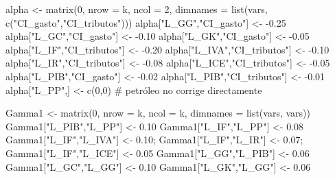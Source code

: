 \documentclass[
  spanish,
  letterpaper,
  DIV=11,
  numbers=noendperiod]{scrartcl}
\newenvironment{Shaded}{\begin{snugshade}}{\end{snugshade}}
\newcommand{\AttributeTok}[1]{\textcolor[rgb]{0.40,0.45,0.13}{#1}}
\newcommand{\CommentTok}[1]{\textcolor[rgb]{0.37,0.37,0.37}{#1}}
\newcommand{\DecValTok}[1]{\textcolor[rgb]{0.68,0.00,0.00}{#1}}
\newcommand{\FloatTok}[1]{\textcolor[rgb]{0.68,0.00,0.00}{#1}}
\newcommand{\FunctionTok}[1]{\textcolor[rgb]{0.28,0.35,0.67}{#1}}
\newcommand{\NormalTok}[1]{\textcolor[rgb]{0.00,0.23,0.31}{#1}}
\newcommand{\OtherTok}[1]{\textcolor[rgb]{0.00,0.23,0.31}{#1}}
\newcommand{\SpecialCharTok}[1]{\textcolor[rgb]{0.37,0.37,0.37}{#1}}
\newcommand{\StringTok}[1]{\textcolor[rgb]{0.13,0.47,0.30}{#1}}
\begin{document}
\begin{Shaded}
\begin{Highlighting}[]
\NormalTok{alpha }\OtherTok{\textless{}{-}} \FunctionTok{matrix}\NormalTok{(}\DecValTok{0}\NormalTok{, }\AttributeTok{nrow =}\NormalTok{ k, }\AttributeTok{ncol =} \DecValTok{2}\NormalTok{, }\AttributeTok{dimnames =} \FunctionTok{list}\NormalTok{(vars, }\FunctionTok{c}\NormalTok{(}\StringTok{"CI\_gasto"}\NormalTok{,}\StringTok{"CI\_tributos"}\NormalTok{)))}
\NormalTok{alpha[}\StringTok{"L\_GG"}\NormalTok{,}\StringTok{"CI\_gasto"}\NormalTok{]  }\OtherTok{\textless{}{-}} \SpecialCharTok{{-}}\FloatTok{0.25}
\NormalTok{alpha[}\StringTok{"L\_GC"}\NormalTok{,}\StringTok{"CI\_gasto"}\NormalTok{]  }\OtherTok{\textless{}{-}} \SpecialCharTok{{-}}\FloatTok{0.10}
\NormalTok{alpha[}\StringTok{"L\_GK"}\NormalTok{,}\StringTok{"CI\_gasto"}\NormalTok{]  }\OtherTok{\textless{}{-}} \SpecialCharTok{{-}}\FloatTok{0.05}
\NormalTok{alpha[}\StringTok{"L\_IF"}\NormalTok{,}\StringTok{"CI\_tributos"}\NormalTok{]  }\OtherTok{\textless{}{-}} \SpecialCharTok{{-}}\FloatTok{0.20}
\NormalTok{alpha[}\StringTok{"L\_IVA"}\NormalTok{,}\StringTok{"CI\_tributos"}\NormalTok{] }\OtherTok{\textless{}{-}} \SpecialCharTok{{-}}\FloatTok{0.10}
\NormalTok{alpha[}\StringTok{"L\_IR"}\NormalTok{,}\StringTok{"CI\_tributos"}\NormalTok{]  }\OtherTok{\textless{}{-}} \SpecialCharTok{{-}}\FloatTok{0.08}
\NormalTok{alpha[}\StringTok{"L\_ICE"}\NormalTok{,}\StringTok{"CI\_tributos"}\NormalTok{] }\OtherTok{\textless{}{-}} \SpecialCharTok{{-}}\FloatTok{0.05}
\NormalTok{alpha[}\StringTok{"L\_PIB"}\NormalTok{,}\StringTok{"CI\_gasto"}\NormalTok{]    }\OtherTok{\textless{}{-}} \SpecialCharTok{{-}}\FloatTok{0.02}
\NormalTok{alpha[}\StringTok{"L\_PIB"}\NormalTok{,}\StringTok{"CI\_tributos"}\NormalTok{] }\OtherTok{\textless{}{-}} \SpecialCharTok{{-}}\FloatTok{0.01}
\NormalTok{alpha[}\StringTok{"L\_PP"}\NormalTok{,] }\OtherTok{\textless{}{-}} \FunctionTok{c}\NormalTok{(}\DecValTok{0}\NormalTok{,}\DecValTok{0}\NormalTok{)  }\CommentTok{\# petróleo no corrige directamente}

\NormalTok{Gamma1 }\OtherTok{\textless{}{-}} \FunctionTok{matrix}\NormalTok{(}\DecValTok{0}\NormalTok{, }\AttributeTok{nrow =}\NormalTok{ k, }\AttributeTok{ncol =}\NormalTok{ k, }\AttributeTok{dimnames =} \FunctionTok{list}\NormalTok{(vars, vars))}
\NormalTok{Gamma1[}\StringTok{"L\_PIB"}\NormalTok{,}\StringTok{"L\_PP"}\NormalTok{] }\OtherTok{\textless{}{-}} \FloatTok{0.10}
\NormalTok{Gamma1[}\StringTok{"L\_IF"}\NormalTok{,}\StringTok{"L\_PP"}\NormalTok{]  }\OtherTok{\textless{}{-}} \FloatTok{0.08}
\NormalTok{Gamma1[}\StringTok{"L\_IF"}\NormalTok{,}\StringTok{"L\_IVA"}\NormalTok{] }\OtherTok{\textless{}{-}} \FloatTok{0.10}\NormalTok{; Gamma1[}\StringTok{"L\_IF"}\NormalTok{,}\StringTok{"L\_IR"}\NormalTok{] }\OtherTok{\textless{}{-}} \FloatTok{0.07}\NormalTok{; Gamma1[}\StringTok{"L\_IF"}\NormalTok{,}\StringTok{"L\_ICE"}\NormalTok{] }\OtherTok{\textless{}{-}} \FloatTok{0.05}
\NormalTok{Gamma1[}\StringTok{"L\_GG"}\NormalTok{,}\StringTok{"L\_PIB"}\NormalTok{] }\OtherTok{\textless{}{-}} \FloatTok{0.06}
\NormalTok{Gamma1[}\StringTok{"L\_GC"}\NormalTok{,}\StringTok{"L\_GG"}\NormalTok{]  }\OtherTok{\textless{}{-}} \FloatTok{0.10}
\NormalTok{Gamma1[}\StringTok{"L\_GK"}\NormalTok{,}\StringTok{"L\_GG"}\NormalTok{]  }\OtherTok{\textless{}{-}} \FloatTok{0.06}


\end{Highlighting}
\end{Shaded}
\end{document}
